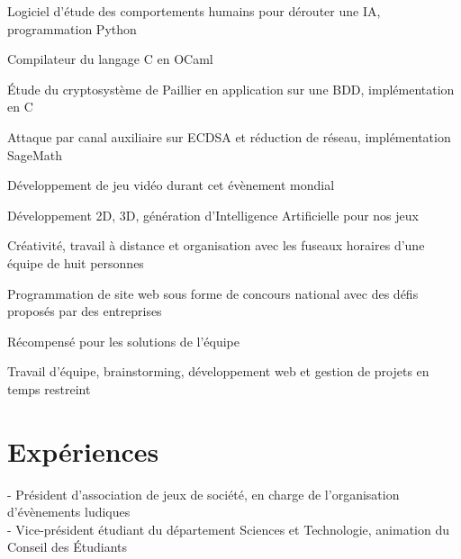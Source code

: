 \documentclass[letterpaper,10pt]{article}
\begin{document}
  \begin{resume_list}
    \item Logiciel d'étude des comportements humains pour dérouter une IA, programmation Python
    \item Compilateur du langage C en OCaml
    \item Étude du cryptosystème de Paillier en application sur une BDD, implémentation en C
    \item Attaque par canal auxiliaire sur ECDSA et réduction de réseau, implémentation SageMath
  \end{resume_list}

  \begin{resume_list}
    \item Développement de jeu vidéo durant cet évènement mondial 
    \item Développement 2D, 3D, génération d'Intelligence Artificielle pour nos jeux
    \item Créativité, travail à distance et organisation avec les fuseaux horaires d'une équipe de huit personnes
  \end{resume_list}  

  \begin{resume_list}
    \item Programmation de site web sous forme de concours national avec des défis proposés par des entreprises
    \item Récompensé pour les solutions de l'équipe
    \item Travail d'équipe, brainstorming, développement web et gestion de projets en temps restreint  
  \end{resume_list}





  \section{Expériences}
  
  \hspace{15pt}- Président d'association de jeux de société, en charge de l'organisation d'évènements ludiques\\
  \hspace{15pt}- Vice-président étudiant du département Sciences et Technologie, animation du Conseil des Étudiants
\end{document}
